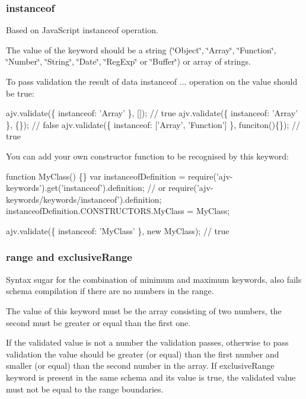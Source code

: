 \subsubsection*{{\ttfamily instanceof}}

Based on Java\+Script {\ttfamily instanceof} operation.

The value of the keyword should be a string ({\ttfamily \char`\"{}\+Object\char`\"{}}, {\ttfamily \char`\"{}\+Array\char`\"{}}, {\ttfamily \char`\"{}\+Function\char`\"{}}, {\ttfamily \char`\"{}\+Number\char`\"{}}, {\ttfamily \char`\"{}\+String\char`\"{}}, {\ttfamily \char`\"{}\+Date\char`\"{}}, {\ttfamily \char`\"{}\+Reg\+Exp\char`\"{}} or {\ttfamily \char`\"{}\+Buffer\char`\"{}}) or array of strings.

To pass validation the result of {\ttfamily data instanceof ...} operation on the value should be true\+:


\begin{DoxyCode}
ajv.validate(\{ instanceof: 'Array' \}, []); // true
ajv.validate(\{ instanceof: 'Array' \}, \{\}); // false
ajv.validate(\{ instanceof: ['Array', 'Function'] \}, funciton()\{\}); // true
\end{DoxyCode}


You can add your own constructor function to be recognised by this keyword\+:


\begin{DoxyCode}
function MyClass() \{\}
var instanceofDefinition = require('ajv-keywords').get('instanceof').definition;
// or require('ajv-keywords/keywords/instanceof').definition;
instanceofDefinition.CONSTRUCTORS.MyClass = MyClass;

ajv.validate(\{ instanceof: 'MyClass' \}, new MyClass); // true
\end{DoxyCode}


\subsubsection*{{\ttfamily range} and {\ttfamily exclusive\+Range}}

Syntax sugar for the combination of minimum and maximum keywords, also fails schema compilation if there are no numbers in the range.

The value of this keyword must be the array consisting of two numbers, the second must be greater or equal than the first one.

If the validated value is not a number the validation passes, otherwise to pass validation the value should be greater (or equal) than the first number and smaller (or equal) than the second number in the array. If {\ttfamily exclusive\+Range} keyword is present in the same schema and its value is true, the validated value must not be equal to the range boundaries.


